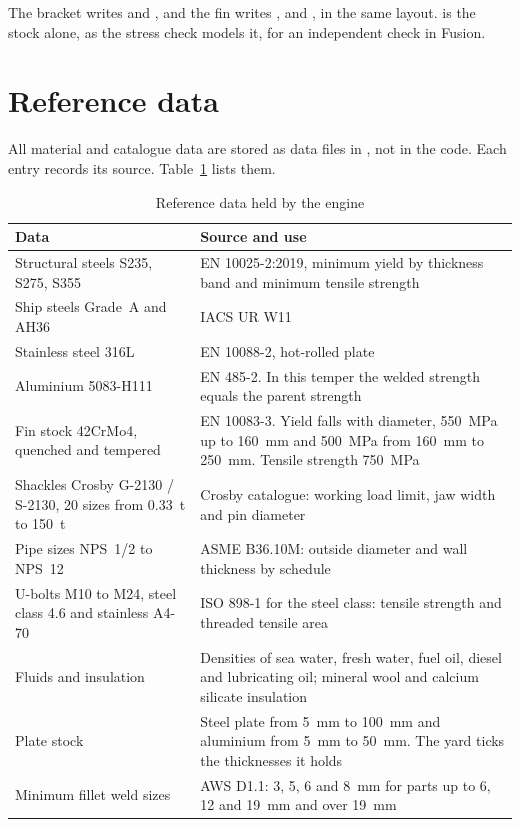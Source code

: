 The bracket writes  and , and the
fin writes ,  and , in the same layout.
 is the stock alone, as the stress check models it, for an
independent check in Fusion.

\section{Reference data}
\label{sec:reference-data}

All material and catalogue data are stored as data files in
, not in the code. Each entry records its source.
Table~\ref{tab:reference-data} lists them.

\begin{table}[H]
\centering
\caption{Reference data held by the engine}
\label{tab:reference-data}
\small
\begin{tabularx}{\textwidth}{>{\raggedright\arraybackslash}p{}X}
\toprule
\textbf{Data} & \textbf{Source and use}\\
\midrule
Structural steels S235, S275, S355 & EN 10025-2:2019, minimum yield by thickness band and minimum tensile strength \cite{en10025}\\
Ship steels Grade~A and AH36 & IACS UR W11 \cite{iacsW11}\\
Stainless steel 316L & EN 10088-2, hot-rolled plate\\
Aluminium 5083-H111 & EN 485-2. In this temper the welded strength equals the parent strength\\
Fin stock 42CrMo4, quenched and tempered & EN 10083-3. Yield falls with diameter, 550~MPa up to 160~mm and 500~MPa from 160~mm to 250~mm. Tensile strength 750~MPa \cite{en10083}\\
Shackles Crosby G-2130 / S-2130, 20 sizes from 0.33~t to 150~t & Crosby catalogue: working load limit, jaw width and pin diameter \cite{crosby2019}\\
Pipe sizes NPS~1/2 to NPS~12 & ASME B36.10M: outside diameter and wall thickness by schedule \cite{asmeB3610}\\
U-bolts M10 to M24, steel class 4.6 and stainless A4-70 & ISO 898-1 for the steel class: tensile strength and threaded tensile area \cite{iso898}\\
Fluids and insulation & Densities of sea water, fresh water, fuel oil, diesel and lubricating oil; mineral wool and calcium silicate insulation\\
Plate stock & Steel plate from 5~mm to 100~mm and aluminium from 5~mm to 50~mm. The yard ticks the thicknesses it holds\\
Minimum fillet weld sizes & AWS D1.1: 3, 5, 6 and 8~mm for parts up to 6, 12 and 19~mm and over 19~mm \cite{awsD11}\\
\bottomrule
\end{tabularx}
\end{table}

